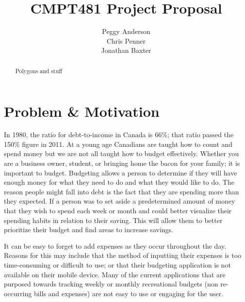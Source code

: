 \documentclass{chi2011}
\begin{document}
\setlength{\paperheight}{11in}
\setlength{\paperwidth}{8.5in}
\setlength{\pdfpageheight}{\paperheight}
\setlength{\pdfpagewidth}{\paperwidth}


\title{CMPT481 Project Proposal}
\author{
\alignauthor Peggy Anderson\\
    \alignauthor Chris Penner\\
    \alignauthor Jonathan Baxter\\
}


\maketitle

\begin{abstract}
    Polygons and stuff
\end{abstract}

\section{Problem \& Motivation}

In 1980, the ratio for debt-to-income in Canada is 66\%; that ratio passed the 150\% figure in 2011. At a young age
Canadians are taught how to count and spend money but we are not all taught how to budget effectively. Whether you are
a business owner, student, or bringing home the bacon for your family; it is important to budget. Budgeting allows a
person to determine if they will have enough money for what they need to do and what they would like to do. The reason
people might fall into debt is the fact that they are spending more than they expected. If a person was to set aside a
predetermined amount of money that they wish to spend each week or month and could better visualize their spending
habits in relation to their saving. This will allow them to better prioritize their budget and find areas to increase
savings.

It can be easy to forget to add expenses as they occur throughout the day. Reasons for this may include that the method
of inputting their expenses is too time-consuming or difficult to use; or that their budgeting application is not
available on their mobile device. Many of the current applications that are purposed towards tracking weekly or monthly
recreational budgets (non re-occurring bills and expenses) are not easy to use or engaging for the user.
\end{document}
